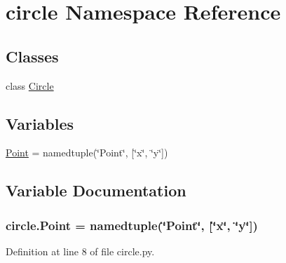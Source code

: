 \hypertarget{namespacecircle}{}\section{circle Namespace Reference}
\label{namespacecircle}
\subsection*{Classes}
\begin{DoxyCompactItemize}
\item 
class \hyperlink{classcircle_1_1_circle}{Circle}
\end{DoxyCompactItemize}
\subsection*{Variables}
\begin{DoxyCompactItemize}
\item 
\hyperlink{namespacecircle_ae073d8de4a1ba7a4a4920f35128f1c48}{Point} = namedtuple(\char`\"{}Point\char`\"{}, \mbox{[}\char`\"{}x\char`\"{}, \char`\"{}y\char`\"{}\mbox{]})
\end{DoxyCompactItemize}


\subsection{Variable Documentation}
\subsubsection[{\texorpdfstring{Point}{Point}}]{\setlength{\rightskip}{0pt plus 5cm}circle.\+Point = namedtuple(\char`\"{}Point\char`\"{}, \mbox{[}\char`\"{}x\char`\"{}, \char`\"{}y\char`\"{}\mbox{]})}\hypertarget{namespacecircle_ae073d8de4a1ba7a4a4920f35128f1c48}{}\label{namespacecircle_ae073d8de4a1ba7a4a4920f35128f1c48}


Definition at line 8 of file circle.\+py.


